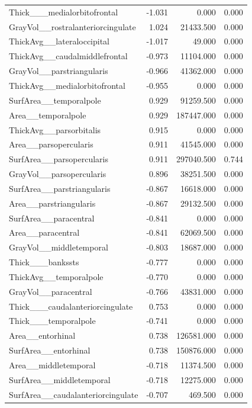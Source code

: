 \documentclass{article}
\begin{document}
\begin{longtable}{lrrr}
	Thick\_\_\_medialorbitofrontal & -1.031 & 0.000 & 0.000 \\
	GrayVol\_\_rostralanteriorcingulate & 1.024 & 21433.500 & 0.000 \\
	ThickAvg\_\_lateraloccipital & -1.017 & 49.000 & 0.000 \\
	ThickAvg\_\_caudalmiddlefrontal & -0.973 & 11104.000 & 0.000 \\
	GrayVol\_\_parstriangularis & -0.966 & 41362.000 & 0.000 \\
	ThickAvg\_\_medialorbitofrontal & -0.955 & 0.000 & 0.000 \\
	SurfArea\_\_temporalpole & 0.929 & 91259.500 & 0.000 \\
	Area\_\_temporalpole & 0.929 & 187447.000 & 0.000 \\
	ThickAvg\_\_parsorbitalis & 0.915 & 0.000 & 0.000 \\
	Area\_\_parsopercularis & 0.911 & 41545.000 & 0.000 \\
	SurfArea\_\_parsopercularis & 0.911 & 297040.500 & 0.744 \\
	GrayVol\_\_parsopercularis & 0.896 & 38251.500 & 0.000 \\
	SurfArea\_\_parstriangularis & -0.867 & 16618.000 & 0.000 \\
	Area\_\_parstriangularis & -0.867 & 29132.500 & 0.000 \\
	SurfArea\_\_paracentral & -0.841 & 0.000 & 0.000 \\
	Area\_\_paracentral & -0.841 & 62069.500 & 0.000 \\
	GrayVol\_\_middletemporal & -0.803 & 18687.000 & 0.000 \\
	Thick\_\_\_bankssts & -0.777 & 0.000 & 0.000 \\
	ThickAvg\_\_temporalpole & -0.770 & 0.000 & 0.000 \\
	GrayVol\_\_paracentral & -0.766 & 43831.000 & 0.000 \\
	Thick\_\_\_caudalanteriorcingulate & 0.753 & 0.000 & 0.000 \\
	Thick\_\_\_temporalpole & -0.741 & 0.000 & 0.000 \\
	Area\_\_entorhinal & 0.738 & 126581.000 & 0.000 \\
	SurfArea\_\_entorhinal & 0.738 & 150876.000 & 0.000 \\
	Area\_\_middletemporal & -0.718 & 11374.500 & 0.000 \\
	SurfArea\_\_middletemporal & -0.718 & 12275.000 & 0.000 \\
	SurfArea\_\_caudalanteriorcingulate & -0.707 & 469.500 & 0.000 \\

\end{longtable}
\end{document}
